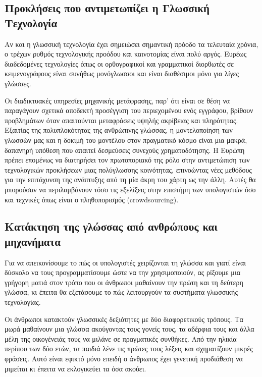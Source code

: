 \begin{multicols}{2}
\subsection{Προκλήσεις που αντιμετωπίζει η Γλωσσική Τεχνολογία}

Αν και η γλωσσική τεχνολογία έχει σημειώσει σημαντική πρόοδο τα τελευταία χρόνια, ο τρέχων ρυθμός τεχνολογικής προόδου και καινοτομίας είναι πολύ αργός. Ευρέως διαδεδομένες τεχνολογίες όπως οι ορθογραφικοί και γραμματικοί διορθωτές σε κειμενογράφους είναι συνήθως μονόγλωσσοι και είναι διαθέσιμοι μόνο για λίγες γλώσσες.


Οι διαδικτυακές υπηρεσίες μηχανικής μετάφρασης, παρ' ότι είναι σε θέση να παραγάγουν σχετικά αποδεκτή προσέγγιση του περιεχομένου ενός εγγράφου, βρίθουν προβλημάτων όταν απαιτούνται μεταφράσεις υψηλής ακρίβειας και πληρότητας. Εξαιτίας της πολυπλοκότητας της ανθρώπινης γλώσσας, η μοντελοποίηση των γλωσσών μας και η δοκιμή του μοντέλου στον πραγματικό κόσμο είναι μια μακρά, δαπανηρή υπόθεση που απαιτεί δεσμεύσεις συνεχούς χρηματοδότησης. Η Ευρώπη πρέπει επομένως να διατηρήσει τον πρωτοποριακό της ρόλο στην αντιμετώπιση των τεχνολογικών προκλήσεων μιας πολύγλωσσης κοινότητας, επινοώντας νέες μεθόδους για την επιτάχυνση της ανάπτυξης από τη μία άκρη του χάρτη ως την άλλη. Αυτές θα μπορούσαν να περιλαμβάνουν τόσο τις εξελίξεις στην επιστήμη των υπολογιστών όσο και τεχνικές όπως είναι ο πληθοπορισμός (crowdsourcing).

\subsection{Κατάκτηση της γλώσσας από ανθρώπους και μηχανήματα}

Για να απεικονίσουμε το πώς οι υπολογιστές χειρίζονται τη γλώσσα και γιατί είναι δύσκολο να τους προγραμματίσουμε ώστε να την χρησιμοποιούν, ας ρίξουμε μια γρήγορη ματιά στον τρόπο που οι άνθρωποι μαθαίνουν την πρώτη και τη δεύτερη γλώσσα, κι έπειτα θα εξετάσουμε το πώς λειτουργούν τα συστήματα γλωσσικής τεχνολογίας.


Οι άνθρωποι κατακτούν γλωσσικές δεξιότητες με δύο διαφορετικούς τρόπους. Τα μωρά μαθαίνουν μια γλώσσα ακούγοντας τους γονείς τους, τα αδέρφια τους και άλλα μέλη της οικογένειάς τους να μιλάνε σε πραγματικές συνθήκες. Από την ηλικία περίπου των δύο ετών, τα παιδιά λένε τις πρώτες τους λέξεις και σχηματίζουν μικρές φράσεις. Αυτό είναι εφικτό μόνο επειδή ο άνθρωπος έχει γενετική προδιάθεση να μιμείται κι έπειτα να εκλογικεύει τα όσα ακούει. 


\end{multicols}
